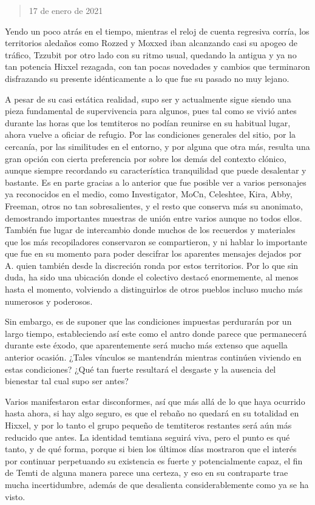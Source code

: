 \documentclass[
  spanish,
]{book}
\begin{document}
\begin{quote}
17 de enero de 2021
\end{quote}

Yendo un poco atrás en el tiempo, mientras el reloj de cuenta regresiva corría, los territorios aledaños como Rozzed y Moxxed iban alcanzando casi su apogeo de tráfico, Tzzubit por otro lado con su ritmo usual, quedando la antigua y ya no tan potencia Hixxel rezagada, con tan pocas novedades y cambios que terminaron disfrazando su presente idénticamente a lo que fue su pasado no muy lejano.

A pesar de su casi estática realidad, supo ser y actualmente sigue siendo una pieza fundamental de supervivencia para algunos, pues tal como se vivió antes durante las horas que los temtiteros no podían reunirse en su habitual lugar, ahora vuelve a oficiar de refugio. Por las condiciones generales del sitio, por la cercanía, por las similitudes en el entorno, y por alguna que otra más, resulta una gran opción con cierta preferencia por sobre los demás del contexto clónico, aunque siempre recordando su característica tranquilidad que puede desalentar y bastante. Es en parte gracias a lo anterior que fue posible ver a varios personajes ya reconocidos en el medio, como Investigator, MoCn, Celeshtee, Kira, Abby, Freeman, otros no tan sobresalientes, y el resto que conserva más su anonimato, demostrando importantes muestras de unión entre varios aunque no todos ellos. También fue lugar de intercambio donde muchos de los recuerdos y materiales que los más recopiladores conservaron se compartieron, y ni hablar lo importante que fue en su momento para poder descifrar los aparentes mensajes dejados por A. quien también desde la discreción ronda por estos territorios. Por lo que sin duda, ha sido una ubicación donde el colectivo destacó enormemente, al menos hasta el momento, volviendo a distinguirlos de otros pueblos incluso mucho más numerosos y poderosos.

Sin embargo, es de suponer que las condiciones impuestas perdurarán por un largo tiempo, estableciendo así este como el antro donde parece que permanecerá durante este éxodo, que aparentemente será mucho más extenso que aquella anterior ocasión. ¿Tales vínculos se mantendrán mientras continúen viviendo en estas condiciones? ¿Qué tan fuerte resultará el desgaste y la ausencia del bienestar tal cual supo ser antes?

Varios manifestaron estar disconformes, así que más allá de lo que haya ocurrido hasta ahora, si hay algo seguro, es que el rebaño no quedará en su totalidad en Hixxel, y por lo tanto el grupo pequeño de temtiteros restantes será aún más reducido que antes. La identidad temtiana seguirá viva, pero el punto es qué tanto, y de qué forma, porque si bien los últimos días mostraron que el interés por continuar perpetuando su existencia es fuerte y potencialmente capaz, el fin de Temti de alguna manera parece una certeza, y eso en su contraparte trae mucha incertidumbre, además de que desalienta considerablemente como ya se ha visto.
\end{document}
